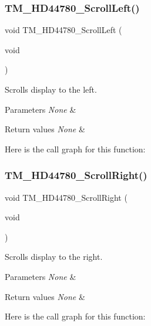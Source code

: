 \subsubsection{\texorpdfstring{T\+M\+\_\+\+H\+D44780\+\_\+\+Scroll\+Left()}{TM\_HD44780\_ScrollLeft()}}
{\footnotesize\ttfamily void T\+M\+\_\+\+H\+D44780\+\_\+\+Scroll\+Left (\begin{DoxyParamCaption}\item[{void}]{ }\end{DoxyParamCaption})}



Scrolls display to the left. 


\begin{DoxyParams}{Parameters}
{\em None} & \\
\hline
\end{DoxyParams}

\begin{DoxyRetVals}{Return values}
{\em None} & \\
\hline
\end{DoxyRetVals}
Here is the call graph for this function\+:
\mbox{\label{group___t_m___h_d44780___functions_ga9ac0912d00ab55d31f36bfef953dd0bf}} 
\subsubsection{\texorpdfstring{T\+M\+\_\+\+H\+D44780\+\_\+\+Scroll\+Right()}{TM\_HD44780\_ScrollRight()}}
{\footnotesize\ttfamily void T\+M\+\_\+\+H\+D44780\+\_\+\+Scroll\+Right (\begin{DoxyParamCaption}\item[{void}]{ }\end{DoxyParamCaption})}



Scrolls display to the right. 


\begin{DoxyParams}{Parameters}
{\em None} & \\
\hline
\end{DoxyParams}

\begin{DoxyRetVals}{Return values}
{\em None} & \\
\hline
\end{DoxyRetVals}
Here is the call graph for this function\+:
